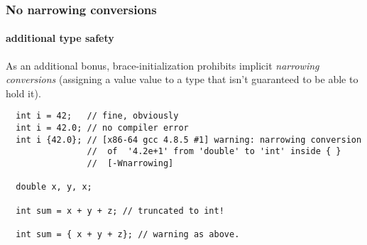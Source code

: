 \begin{frame}[fragile,t]
\frametitle{No narrowing conversions}
\framesubtitle{additional type safety}
As an additional bonus, brace-initialization prohibits implicit
\emph{narrowing conversions} (assigning a value value to a type that isn't
guaranteed to be able to hold it).
{\scriptsize\begin{verbatim}
  int i = 42;   // fine, obviously
  int i = 42.0; // no compiler error
  int i {42.0}; // [x86-64 gcc 4.8.5 #1] warning: narrowing conversion
                //  of  '4.2e+1' from 'double' to 'int' inside { } 
                //  [-Wnarrowing]

  double x, y, x;
  
  int sum = x + y + z; // truncated to int!
  
  int sum = { x + y + z}; // warning as above.
\end{verbatim}}
\begin{center}
\end{center}

\end{frame}

